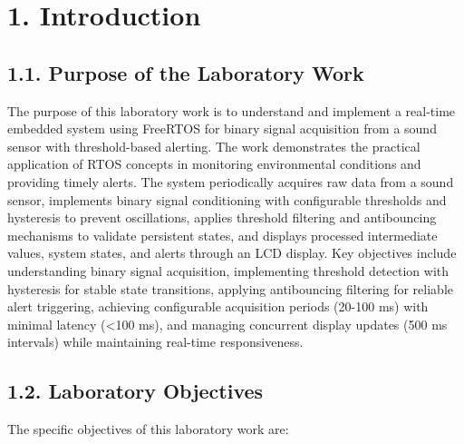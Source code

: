 \documentclass[12pt]{article}
\begin{document}
\setcounter{page}{1}
\pagestyle{fancy}
\fancyhf{}
\rhead{\thepage}

\section*{1. Introduction}

\subsection*{1.1. Purpose of the Laboratory Work}

The purpose of this laboratory work is to understand and implement a real-time embedded system using FreeRTOS for binary signal acquisition from a sound sensor with threshold-based alerting. The work demonstrates the practical application of RTOS concepts in monitoring environmental conditions and providing timely alerts. The system periodically acquires raw data from a sound sensor, implements binary signal conditioning with configurable thresholds and hysteresis to prevent oscillations, applies threshold filtering and antibouncing mechanisms to validate persistent states, and displays processed intermediate values, system states, and alerts through an LCD display. Key objectives include understanding binary signal acquisition, implementing threshold detection with hysteresis for stable state transitions, applying antibouncing filtering for reliable alert triggering, achieving configurable acquisition periods (20-100 ms) with minimal latency (<100 ms), and managing concurrent display updates (500 ms intervals) while maintaining real-time responsiveness.

\subsection*{1.2. Laboratory Objectives}

The specific objectives of this laboratory work are:
\end{document}
